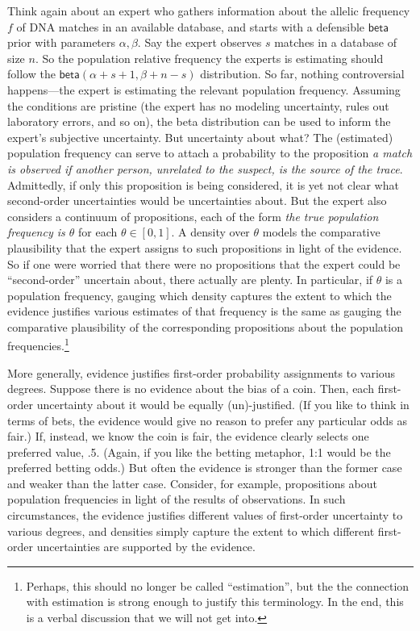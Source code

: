 \documentclass[
  10pt,
  dvipsnames,enabledeprecatedfontcommands]{scrartcl}
\newcommand{\s}[1]{\mbox{$\mathsf{#1}$}}
\begin{document}
Think again about an expert who gathers information about the allelic
frequency \(f\) of DNA matches in an available database, and starts with
a defensible \s{beta} prior with parameters \(\alpha, \beta\). Say the
expert observes \(s\) matches in a database of size \(n\). So the
population relative frequency the experts is estimating should follow
the \(\s{beta}(\alpha + s + 1 ,\beta + n - s)\) distribution. So far,
nothing controversial happens---the expert is estimating the relevant
population frequency. Assuming the conditions are pristine (the expert
has no modeling uncertainty, rules out laboratory errors, and so on),
the beta distribution can be used to inform the expert's subjective
uncertainty. But uncertainty about what? The (estimated) population
frequency can serve to attach a probability to the proposition
\emph{a match is observed  if another person, unrelated to the suspect, is the source of the trace}.
Admittedly, if only this proposition is being considered, it is yet not
clear what second-order uncertainties would be uncertainties about. But
the expert also considers a continuum of propositions, each of the form
\emph{the true population frequency is $\theta$} for each
\(\theta\in [0,1]\). A density over \(\theta\) models the comparative
plausibility that the expert assigns to such propositions in light of
the evidence. So if one were worried that there were no propositions
that the expert could be ``second-order'' uncertain about, there
actually are plenty. In particular, if \(\theta\) is a population
frequency, gauging which density captures the extent to which the
evidence justifies various estimates of that frequency is the same as
gauging the comparative plausibility of the corresponding propositions
about the population frequencies.\footnote{Perhaps, this should no
  longer be called ``estimation'', but the the connection with
  estimation is strong enough to justify this terminology. In the end,
  this is a verbal discussion that we will not get into.}

More generally, evidence justifies first-order probability assignments
to various degrees. Suppose there is no evidence about the bias of a
coin. Then, each first-order uncertainty about it would be equally
(un)-justified. (If you like to think in terms of bets, the evidence
would give no reason to prefer any particular odds as fair.) If,
instead, we know the coin is fair, the evidence clearly selects one
preferred value, .5. (Again, if you like the betting metaphor, 1:1 would
be the preferred betting odds.) But often the evidence is stronger than
the former case and weaker than the latter case. Consider, for example,
propositions about population frequencies in light of the results of
observations. In such circumstances, the evidence justifies different
values of first-order uncertainty to various degrees, and densities
simply capture the extent to which different first-order uncertainties
are supported by the evidence.
\end{document}
